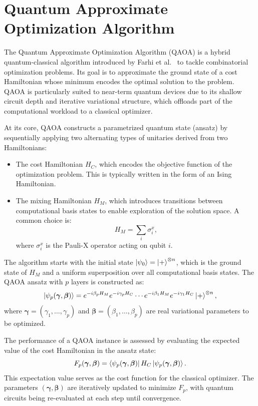 \section{Quantum Approximate Optimization Algorithm}
\label{Section:QAOA}

The Quantum Approximate Optimization Algorithm (QAOA) is a hybrid quantum-classical algorithm
introduced by Farhi et al.~\cite{farhi_quantum_2014} to tackle combinatorial optimization problems.
Its goal is to approximate the ground state of a cost Hamiltonian whose minimum encodes the
optimal solution to the problem. QAOA is particularly suited to near-term quantum devices
due to its shallow circuit depth and iterative variational structure, which offloads part
of the computational workload to a classical optimizer.

At its core, QAOA constructs a parametrized quantum state (ansatz) by sequentially applying
two alternating types of unitaries derived from two Hamiltonians:
\begin{itemize}
    \item The cost Hamiltonian $H_C$, which encodes the objective function of the optimization
    problem. This is typically written in the form of an Ising Hamiltonian.
    \item The mixing Hamiltonian $H_M$, which introduces transitions between computational
    basis states to enable exploration of the solution space. A common choice is:
    \begin{equation}
        H_M = \sum_i \sigma_i^x,
        \label{eq:mixing_hamiltonian}
    \end{equation}
    where $\sigma_i^x$ is the Pauli-X operator acting on qubit $i$.
\end{itemize}

The algorithm starts with the initial state $\ket{\psi_0} = \ket{+}^{\otimes n}$, which is
the ground state of $H_M$ and a uniform superposition over all computational basis states.
The QAOA ansatz with $p$ layers is constructed as:
\begin{equation}
    \ket{\psi_p(\bm{\gamma}, \bm{\beta})} = e^{-i \beta_p H_M} e^{- i \gamma_p H_C} \cdots
    e^{-i \beta_1 H_M} e^{- i \gamma_1 H_C} \ket{+}^{\otimes n},
\end{equation}
where $\bm{\gamma} = (\gamma_1, \dots, \gamma_p)$ and $\bm{\beta} = (\beta_1, \dots, \beta_p)$
are real variational parameters to be optimized.

The performance of a QAOA instance is assessed by evaluating the expected value of the cost
Hamiltonian in the ansatz state:
\begin{equation}
    F_p (\bm{\gamma}, \bm{\beta}) = \bra{\psi_p (\bm{\gamma}, \bm{\beta})} H_C \ket{\psi_p (\bm{\gamma}, \bm{\beta})}.
    \label{eq:cost_function}
\end{equation}
This expectation value serves as the cost function for the classical optimizer. The parameters $(\bm{\gamma}, \bm{\beta})$ are iteratively updated to minimize $F_p$, with quantum circuits being re-evaluated at each step until convergence.

